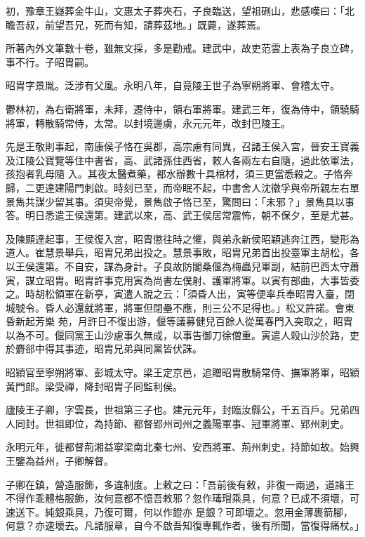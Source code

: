 \begin{pinyinscope}
 初，豫章王嶷葬金牛山，文惠太子葬夾石，子良臨送，望祖硎山，悲感嘆曰：「北瞻吾叔，前望吾兄，死而有知，請葬茲地。」既薨，遂葬焉。



 所著內外文筆數十卷，雖無文採，多是勸戒。建武中，故吏范雲上表為子良立碑，事不行。子昭胄嗣。



 昭胄字景胤。泛涉有父風。永明八年，自竟陵王世子為寧朔將軍、會稽太守。



 鬱林初，為右衛將軍，未拜，遷侍中，領右軍將軍。建武三年，復為侍中，領驍騎將軍，轉散騎常侍，太常。以封境邊虜，永元元年，改封巴陵王。



 先是王敬則事起，南康侯子恪在吳郡，高宗慮有同異，召諸王侯入宮，晉安王寶義及江陵公寶覽等住中書省，高、武諸孫住西省，敕人各兩左右自隨，過此依軍法，孩抱者乳母隨
 入。其夜太醫煮藥，都水辦數十具棺材，須三更當悉殺之。子恪奔歸，二更達建陽門刺啟。時刻已至，而帝眠不起，中書舍人沈徽孚與帝所親左右單景雋共謀少留其事。須臾帝覺，景雋啟子恪已至，驚問曰：「未邪？」景雋具以事答。明日悉遣王侯還第。建武以來，高、武王侯居常震怖，朝不保夕，至是尤甚。



 及陳顯達起事，王侯復入宮，昭胄懲往時之懼，與弟永新侯昭穎逃奔江西，變形為道人。崔慧景舉兵，昭胄兄弟出投之。慧景事敗，昭胄兄弟首出投臺軍主胡松，各以王侯還第。不自安，謀為身計。子良故防閣桑偃為梅蟲兒軍副，結前巴西太守蕭寅，謀立昭胄。昭胄許事克用寅為尚書左僕射、護軍將軍。以寅有部曲，大事皆委之。時胡松領軍在新亭，寅遣人說之云：「須昏人出，寅等便率兵奉昭胄入臺，閉城號令。昏人必還就將軍，將軍但閉壘不應，則三公不足得也。」松又許諾。會東昏新起芳樂
 苑，月許日不復出游，偃等議募健兒百餘人從萬春門入突取之，昭胄以為不可。偃同黨王山沙慮事久無成，以事告御刀徐僧重。寅遣人殺山沙於路，吏於麝郤中得其事迹，昭胄兄弟與同黨皆伏誅。



 昭穎官至寧朔將軍、彭城太守。梁王定京邑，追贈昭胄散騎常侍、撫軍將軍，昭穎黃門郎。梁受禪，降封昭胄子同監利侯。



 廬陵王子卿，字雲長，世祖第三子也。建元元年，封臨汝縣公，千五百戶。兄弟四人同封。世祖即位，為持節、都督郢州司州之義陽軍事、冠軍將軍、郢州刺史。



 永明元年，徙都督荊湘益寧梁南北秦七州、安西將軍、荊州刺史，持節如故。始興王鑒為益州，子卿解督。



 子卿在鎮，營造服飾，多違制度。上敕之曰：「吾前後有敕，非復一兩過，道諸王不得作乖體格服飾，汝何意都不憶吾敕邪？忽作瑇瑁乘具，何意？已成不須壞，可速送下。純銀乘具，乃復可爾，何以作鐙亦
 是銀？可即壞之。忽用金薄裹箭腳，何意？亦速壞去。凡諸服章，自今不啟吾知復專輒作者，後有所聞，當復得痛杖。」




\end{pinyinscope}
